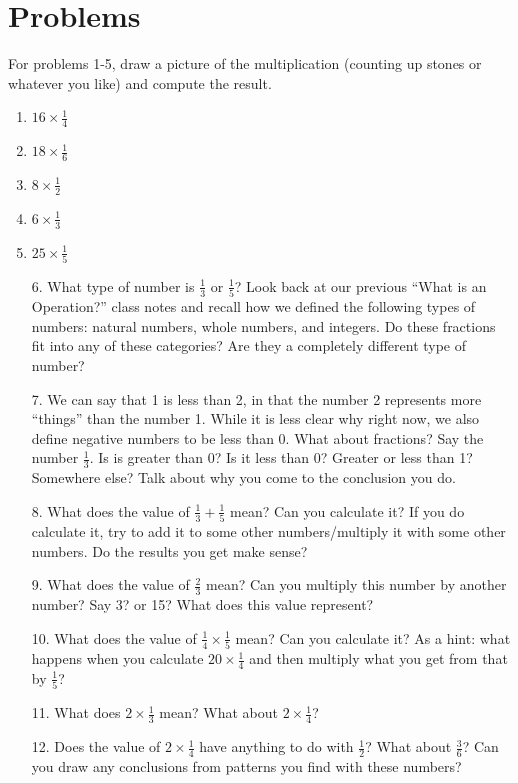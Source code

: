 \documentclass{article}
\begin{document}
\section*{Problems}
\begin{multicols*}{2}
    For problems 1-5, draw a picture of the multiplication (counting up stones or whatever you like) and compute the result.
    \begin{enumerate}
        \item $16 \times \frac{1}{4}$
        \item $18 \times \frac{1}{6}$
        \item $8 \times \frac{1}{2}$
        \item $6 \times \frac{1}{3}$
        \item $25 \times \frac{1}{5}$
    \end{enumerate}

    \begin{enumerate}
        \item[6. ] What type of number is $\frac{1}{3}$ or $\frac{1}{5}$? Look back at our previous ``What is an Operation?'' class notes and recall how we defined the following types of numbers: natural numbers, whole numbers, and integers. Do these fractions fit into any of these categories? Are they a completely different type of number? 
        \item[7. ] We can say that 1 is less than 2, in that the number 2 represents more ``things'' than the number 1. While it is less clear why right now, we also define negative numbers to be less than 0. What about fractions? Say the number $\frac{1}{3}$. Is is greater than 0? Is it less than 0? Greater or less than 1? Somewhere else? Talk about why you come to the conclusion you do.
        \item[8. ] What does the value of $\frac{1}{3} + \frac{1}{5}$ mean? Can you calculate it? If you do calculate it, try to add it to some other numbers/multiply it with some other numbers. Do the results you get make sense? 
        \item[9. ] What does the value of $\frac{2}{3}$ mean? Can you multiply this number by another number? Say 3? or 15? What does this value represent? 
        \item[10. ] What does the value of $\frac{1}{4} \times \frac{1}{5}$ mean? Can you calculate it? As a hint: what happens when you calculate $20 \times \frac{1}{4}$ and then multiply what you get from that by $\frac{1}{5}$?
        \item[11. ] What does $2 \times \frac{1}{3}$ mean? What about $2 \times \frac{1}{4}$? 
        \item[12. ] Does the value of $2 \times \frac{1}{4}$ have anything to do with $\frac{1}{2}$? What about $\frac{3}{6}$? Can you draw any conclusions from patterns you find with these numbers?
    \end{enumerate}
\end{multicols*}
\end{document}
